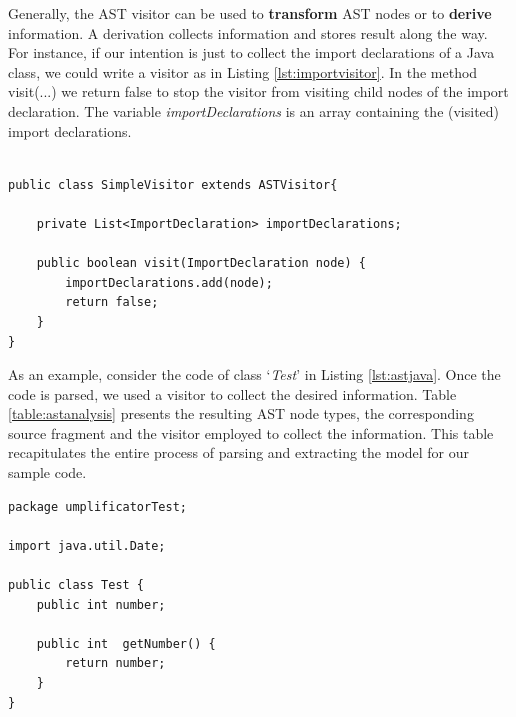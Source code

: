 Generally, the AST visitor can be used to \textbf{transform} AST nodes or to \textbf{derive} information. A derivation collects information and stores result along the way. For instance, if our intention is just to collect the import declarations of a Java class, we could write a visitor as in Listing \ref{lst:importvisitor}. In the method visit(...) we return false to stop the visitor from visiting child nodes of the import declaration. The variable \textit{importDeclarations} is an array containing the (visited) import declarations. 

\begin{lstlisting}[style=java, caption=A visitor for import declarations in Java source code, label=lst:importvisitor]

public class SimpleVisitor extends ASTVisitor{

	private List<ImportDeclaration> importDeclarations;

	public boolean visit(ImportDeclaration node) {
	    importDeclarations.add(node);
	    return false;
	}
}
\end{lstlisting}

As an example, consider the code of class `\textit{Test}' in Listing \ref{lst:astjava}. Once the code is parsed, we used a visitor to collect the desired information. Table \ref{table:astanalysis} presents the resulting AST node types, the corresponding source fragment and the visitor employed to collect the information. This table recapitulates the entire process of parsing and extracting the model for our sample code. 


\begin{lstlisting}[style=java, caption=Test.java, label=lst:astjava]
package umplificatorTest;

import java.util.Date;

public class Test {
	public int number;
	
	public int  getNumber() {
		return number;
	}
}
\end{lstlisting}

